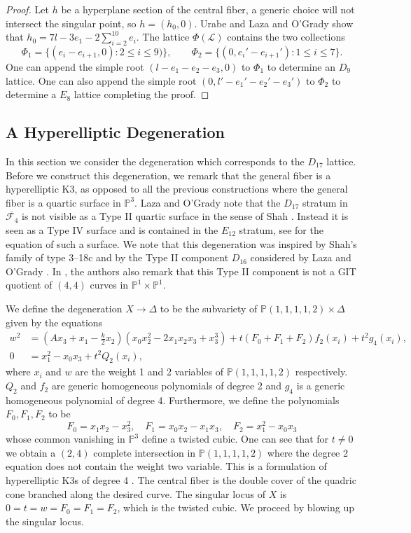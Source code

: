 \documentclass[a4paper]{amsart}
\theoremstyle{definition}
\theoremstyle{plain}
\theoremstyle{remark}
\newcommand{\PS}{\mathbb{P}}
\begin{document}
\begin{proof}
Let $h$ be a hyperplane section of the central fiber, a generic choice will not intersect the singular point, so $h=(h_0,0)$. Urabe \cite[Proposition 4.3]{Ura84} and Laza and O'Grady \cite[Remark 4.2]{LOG19} show that $h_0 = 7l-3e_1-2\sum_{i=2}^{10}e_i$. The lattice $\Phi(\mathscr{L})$ contains the two collections 
$$\Phi_1 = \{(e_i-e_{i+1},0) : 2 \leq i \leq 9) \}, \qquad \Phi_2 = \{(0,e_i'-e_{i+1}') : 1\leq i\leq7 \}.$$
One can append the simple root $(l-e_1-e_2-e_3,0)$ to $\Phi_1$ to determine an $D_9$ lattice. One can also append the simple root $(0,l'-e_1'-e_2'-e_3')$ to $\Phi_2$ to determine a $E_8$ lattice completing the proof.
\end{proof}

\subsection{A Hyperelliptic Degeneration}\label{sect:hyperelliptic degen}
In this section we consider the degeneration which corresponds to the $D_{17}$ lattice. Before we construct this degeneration, we remark that the general fiber is a hyperelliptic K3, as opposed to all the previous constructions where the general fiber is a quartic surface in $\PS^3$. Laza and O'Grady \cite[7.3]{LOG19} note that the $D_{17}$ stratum in $\overline{\mathcal{F}_4}$ is not visible as a Type II quartic surface in the sense of Shah \cite[Theorem 2.4]{Shah81}. Instead it is seen as a Type IV surface and is contained in the $E_{12}$ stratum, see \cite[Theorem 2.4, S-4.3.1]{Shah81} for the equation of such a surface. We note that this degeneration was inspired by Shah's family of type 3--18c \cite[p. 306]{Shah81} and by the Type II component $D_{16}$ considered by Laza and O'Grady \cite{LOG21}. In \cite{LOG21}, the authors also remark that this Type II component is not a GIT quotient of $(4,4)$ curves in $\PS^1\times\PS^1$.

We define the degeneration $X\rightarrow \Delta$ to be the subvariety of $\PS(1,1,1,1,2)\times \Delta$ given by the equations
\begin{align*}
w^2&=\left(Ax_3+x_1-\frac{k}{2}x_2\right)(x_0x_2^2-2x_1x_2x_3+x_3^3)+t(F_0+F_1+F_2)f_2(x_i)+t^2g_4(x_i),\\
0&=x_1^2-x_0x_3+t^2Q_2(x_i),
\end{align*}
where $x_i$ and $w$ are the weight 1 and 2 variables of $\PS(1,1,1,1,2)$ respectively. $Q_2$ and $f_2$ are generic homogeneous polynomials of degree 2 and $g_4$ is a generic homogeneous polynomial of degree 4. Furthermore, we define the polynomials $F_0,F_1,F_2$ to be
$$F_0=x_1x_2-x_3^2, \quad F_1 = x_0x_2-x_1x_3,\quad F_2 = x_1^2-x_0x_3$$
whose common vanishing in $\PS^3$ define a twisted cubic. One can see that for $t \neq 0$ we obtain a $(2,4)$ complete intersection in $\PS(1,1,1,1,2)$ where the degree 2 equation does not contain the weight two variable. This is a formulation of hyperelliptic K3s of degree 4 \cite[Example 2]{HarThom15}. The central fiber is the double cover of the quadric cone branched along the desired curve. The singular locus of $X$ is $0=t=w=F_0=F_1=F_2$, which is the twisted cubic. We proceed by blowing up the singular locus.
\end{document}
